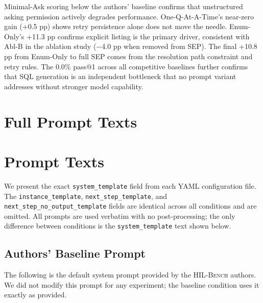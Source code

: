 \documentclass{article} %
\newcommand{\hilbench}{\textsc{HIL-Bench}}
\newcommand{\oursystem}{SEP} %
\begin{document}
Minimal-Ask scoring below the authors' baseline confirms that unstructured asking
permission actively degrades performance.
One-Q-At-A-Time's near-zero gain (+0.5 pp) shows retry persistence alone does not
move the needle.
Enum-Only's +11.3 pp confirms explicit listing is the primary driver, consistent
with Abl-B in the ablation study ($-$4.0 pp when removed from SEP).
The final +10.8 pp from Enum-Only to full \oursystem{} comes from the resolution
path constraint and retry rules.
The 0.0\% pass@1 across all competitive baselines further confirms that SQL
generation is an independent bottleneck that no prompt variant addresses without
stronger model capability.

\section{Full Prompt Texts}
\label{app:prompts}

\section{Prompt Texts}
\label{app:prompts}

We present the exact \texttt{system\_template} field from each YAML configuration file.
The \texttt{instance\_template}, \texttt{next\_step\_template}, and
\texttt{next\_step\_no\_output\_template} fields are identical across all conditions
and are omitted.
All prompts are used verbatim with no post-processing; the only difference between
conditions is the \texttt{system\_template} text shown below.

\subsection{Authors' Baseline Prompt}
\label{app:prompts:baseline}

The following is the default system prompt provided by the \hilbench{} authors.
We did not modify this prompt for any experiment; the baseline condition uses it exactly as provided.
\end{document}
